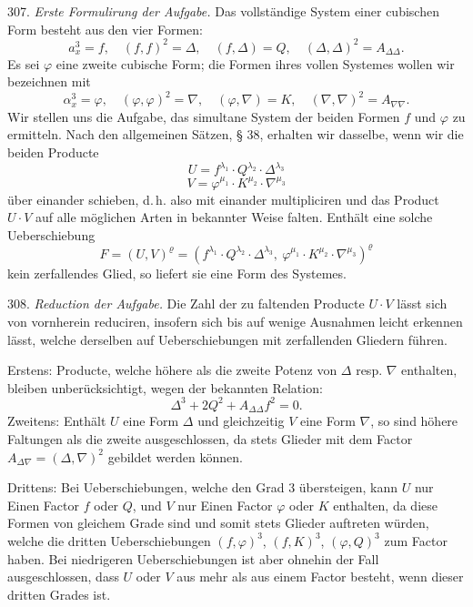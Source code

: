\documentclass[11pt]{article}
\providecommand{\weberpage}[1]{}
\let\Delta\varDelta
\begin{document}
307. \textit{Erste Formulirung der Aufgabe.} Das vollständige System einer
cubischen Form besteht aus den vier Formen:
\[
a_x^3 = f, \quad (f,f)^2 = \Delta, \quad (f,\Delta) = Q, \quad (\Delta,\Delta)^2 = A_{\Delta\Delta}.
\]
Es sei $\varphi$ eine zweite cubische Form; die Formen ihres vollen
Systemes wollen wir bezeichnen mit
\[
\alpha_x^3 = \varphi, \quad (\varphi,\varphi)^2 = \nabla, \quad (\varphi,\nabla) = K, \quad (\nabla,\nabla)^2 = A_{\nabla\nabla}.
\]
Wir stellen uns die Aufgabe, das simultane System der beiden Formen $f$ und
$\varphi$ zu ermitteln. Nach den allgemeinen Sätzen, § 38, erhalten wir
dasselbe, wenn wir die beiden Producte
\[
U = f^{\lambda_1}\cdot Q^{\lambda_2}\cdot \Delta^{\lambda_3}
\]
\[
V = \varphi^{\mu_1}\cdot K^{\mu_2}\cdot \nabla^{\mu_3}
\]
über einander schieben, d.\,h. also mit einander multipliciren und das
Product $U\cdot V$ auf alle möglichen Arten in bekannter Weise falten.
Enthält eine solche Ueberschiebung
\[
F = (U,V)^{\varrho} = (f^{\lambda_1}\cdot Q^{\lambda_2}\cdot \Delta^{\lambda_3}, \ \varphi^{\mu_1}\cdot K^{\mu_2}\cdot \nabla^{\mu_3})^{\varrho}
\]
kein zerfallendes Glied, so liefert sie eine Form des Systemes.

308. \textit{Reduction der Aufgabe.} Die Zahl der zu faltenden Producte
$U\cdot V$ lässt sich von vornherein reduciren, insofern sich bis auf
wenige Ausnahmen leicht erkennen lässt, welche derselben auf
Ueberschiebungen mit zerfallenden Gliedern führen.

Erstens: Producte, welche höhere als die zweite Potenz von $\Delta$ resp.
$\nabla$ enthalten, bleiben unberücksichtigt, wegen der bekannten Relation:
\[
\Delta^3 + 2Q^2 + A_{\Delta\Delta}f^2 = 0.
\]
Zweitens: Enthält $U$ eine Form $\Delta$ und gleichzeitig $V$ eine Form
$\nabla$, so sind höhere Faltungen als die zweite ausgeschlossen, da stets
Glieder mit dem Factor $A_{\Delta\nabla} = (\Delta,\nabla)^2$ gebildet
werden können.


\weberpage{331}

Drittens: Bei Ueberschiebungen, welche den Grad 3 übersteigen, kann $U$ nur
Einen Factor $f$ oder $Q$, und $V$ nur Einen Factor $\varphi$ oder $K$
enthalten, da diese Formen von gleichem Grade sind und somit stets Glieder
auftreten würden, welche die dritten Ueberschiebungen $(f,\varphi)^3$,
$(f,K)^3$, $(\varphi,Q)^3$ zum Factor haben. Bei niedrigeren
Ueberschiebungen ist aber ohnehin der Fall ausgeschlossen, dass $U$ oder
$V$ aus mehr als aus einem Factor besteht, wenn dieser dritten Grades ist.
\end{document}
